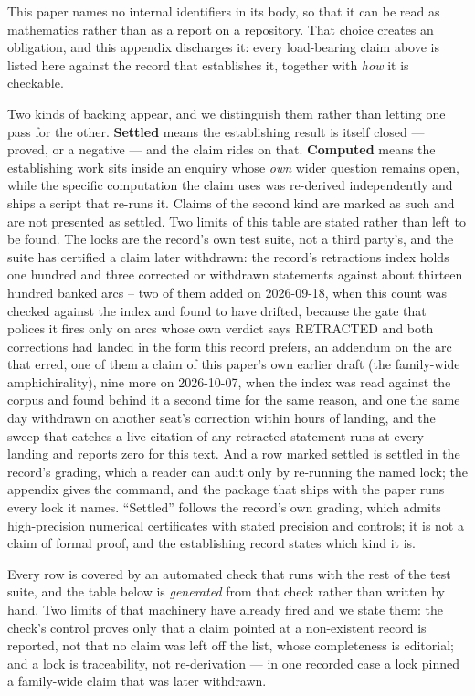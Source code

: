 \documentclass[11pt,a4paper]{article}
\theoremstyle{definition}
\theoremstyle{remark}
\begin{document}
This paper names no internal identifiers in its body, so that it can be read as mathematics rather
than as a report on a repository. That choice creates an obligation, and this appendix discharges
it: every load-bearing claim above is listed here against the record that establishes it, together
with \emph{how} it is checkable.

Two kinds of backing appear, and we distinguish them rather than letting one pass for the other.
\textbf{Settled} means the establishing result is itself closed --- proved, or a negative --- and
the claim rides on that. \textbf{Computed} means the establishing work sits inside an enquiry whose
\emph{own} wider question remains open, while the specific computation the claim uses was
re-derived independently and ships a script that re-runs it. Claims of the second kind are marked as such and are not presented as settled. Two limits of this table are stated rather than left to be found. The locks are the record's own test suite, not a third party's, and the suite has certified a claim later withdrawn: the record's retractions index holds one hundred and three corrected or withdrawn statements against about thirteen hundred banked arcs -- two of them added on 2026-09-18, when this count was checked against the index and found to have drifted, because the gate that polices it fires only on arcs whose own verdict says RETRACTED and both corrections had landed in the form this record prefers, an addendum on the arc that erred, one of them a claim of this paper's own earlier draft (the family-wide amphichirality), nine more on 2026-10-07, when the index was read against the corpus and found behind it a second time for the same reason, and one the same day withdrawn on another seat's correction within hours of landing, and the sweep that catches a live citation of any retracted statement runs at every landing and reports zero for this text. And a row marked settled is settled in the record's grading, which a reader can audit only by re-running the named lock; the appendix gives the command, and the package that ships with the paper runs every lock it names. ``Settled'' follows the record's own grading, which admits high-precision numerical certificates with stated
precision and controls; it is not a claim of formal proof, and the establishing record states which kind it is.

Every row is covered by an automated check that runs with the rest of the test suite, and the table
below is \emph{generated} from that check rather than written by hand. Two limits of that machinery have already
fired and we state them: the check's control proves only that a claim pointed at a non-existent record is reported,
not that no claim was left off the list, whose completeness is editorial; and a lock is traceability, not
re-derivation --- in one recorded case a lock pinned a family-wide claim that was later withdrawn.
\end{document}
